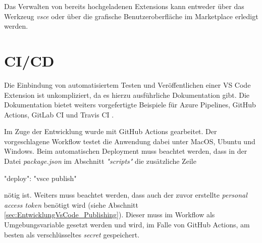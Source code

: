 Das Verwalten von bereits hochgeladenen Extensions kann entweder
über das Werkzeug \emph{vsce} oder über die grafische Benutzeroberfläche
im Marketplace erledigt werden.

\section{CI/CD}
\label{sec:EntwicklungVsCode_CICD}

Die Einbindung von automatisiertem Testen und Veröffentlichen
einer VS Code Extension ist unkompliziert, da es hierzu
ausführliche Dokumentation gibt. Die Dokumentation bietet
weiters vorgefertigte Beispiele für Azure Pipelines, 
GitHub Actions, GitLab CI und Travis CI \cite{VSCodeExtensionAPIContinuousIntegration}.

Im Zuge der Entwicklung wurde mit GitHub Actions gearbeitet.
Der vorgeschlagene Workflow testet die Anwendung dabei unter
MacOS, Ubuntu und Windows. Beim automatischen Deployment muss
beachtet werden, dass in der Datei \emph{package.json} im
Abschnitt \emph{"scripts"} die zusätzliche Zeile
\begin{JsCode}[numbers=none]
"deploy": "vsce publish"
\end{JsCode}
nötig ist. Weiters muss beachtet werden, dass auch der zuvor erstellte 
\emph{personal access token} benötigt wird
(siehe Abschnitt \ref{sec:EntwicklungVsCode_Publishing}).
Dieser muss im Workflow als Umgebungsvariable gesetzt werden und
wird, im Falle von GitHub Actions, am besten als verschlüsseltes
\emph{secret} gespeichert.